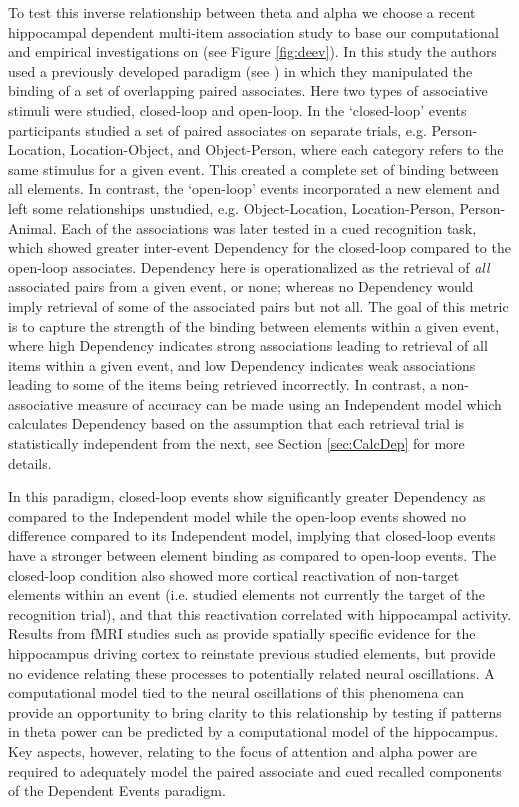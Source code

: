 \documentclass[11pt, titlepage, twoside]{article}
\begin{document}
To test this inverse relationship between theta and alpha we choose a recent hippocampal dependent multi-item association study to base our computational and empirical investigations on \parencite{HornerBisbyBushEtAl15} (see Figure \ref{fig:deev}).  In this study the authors used a previously developed paradigm (see \textcite{HornerBurgess13,HornerBurgess14}) in which they manipulated the binding of a set of overlapping paired associates.   Here two types of associative stimuli were studied, closed-loop and open-loop. In the `closed-loop' events participants studied a set of paired associates on separate trials, e.g. Person-Location, Location-Object, and Object-Person, where each category refers to the same stimulus for a given event.  This created a complete set of binding between all elements.   In contrast, the `open-loop' events incorporated a new element and left some relationships unstudied, e.g. Object-Location, Location-Person, Person-Animal.  Each of the associations was later tested in a cued recognition task, which showed greater inter-event Dependency for the closed-loop compared to the open-loop associates.  Dependency here is operationalized as the retrieval of \emph{all} associated pairs from a given event, or none; whereas no Dependency would imply retrieval of some of the associated pairs but not all.  The goal of this metric is to capture the strength of the binding between elements within a given event, where high Dependency indicates strong associations leading to retrieval of all items within a given event, and low Dependency indicates weak associations leading to some of the items being retrieved incorrectly. In contrast, a non-associative measure of accuracy can be made using an Independent model which calculates Dependency based on the assumption that each retrieval trial is statistically independent from the next, see Section \ref{sec:CalcDep} for more details.  


In this paradigm, closed-loop events show significantly greater Dependency as compared to the Independent model while the open-loop events showed no difference compared to its Independent model, implying that closed-loop events have a stronger between element binding as compared to open-loop events.  The closed-loop condition also showed more cortical reactivation of non-target elements within an event (i.e. studied elements not currently the target of the recognition trial), and that this reactivation correlated with hippocampal activity.  Results from fMRI studies such as \textcite{HornerBisbyBushEtAl15} provide spatially specific evidence for the hippocampus driving cortex to reinstate previous studied elements, but provide no evidence relating these processes to potentially related neural oscillations.  A computational model tied to the neural oscillations of this phenomena can provide an opportunity to bring clarity to this relationship by testing if patterns in theta power can be predicted by a computational model of the hippocampus.  Key aspects, however, relating to the focus of attention and alpha power are required to adequately model the paired associate and cued recalled components of the Dependent Events paradigm.
\end{document}
